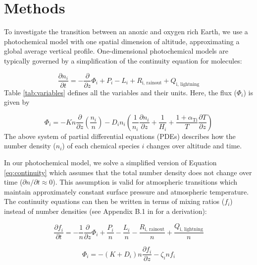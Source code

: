 \section{Methods} \label{sec:goe_methods}

To investigate the transition between an anoxic and oxygen rich Earth, we use a photochemical model with one spatial dimension of altitude, approximating a global average vertical profile. One-dimensional photochemical models are typically governed by a simplification of the continuity equation for molecules:

\begin{equation} \label{eq:continuity}
  \frac{\partial n_{i}}{\partial t} = - \frac{\partial}{\partial z}\Phi_{i} + P_{i} - L_{i} + R_{\text{i,\ rainout}} + Q_{\text{i,\ lightning}}
\end{equation}
Table \ref{tab:variables} defines all the variables and their units. Here, the flux ($\Phi_{i}$) is given by

\begin{equation} 
  \Phi_{i} = - Kn\frac{\partial}{\partial z}\left( \frac{n_{i}}{n} \right) - D_{i}n_{i}\left( \frac{1}{n_{i}}\frac{\partial n_{i}}{\partial z} + \frac{1}{H_{i}} + \frac{1 + \alpha_{\text{Ti}}}{T}\frac{\partial T}{\partial z} \right)
\end{equation}
The above system of partial differential equations (PDEs) describes how the number density ($n_{i}$) of each chemical species $i$ changes over altitude and time.

In our photochemical model, we solve a simplified version of Equation \eqref{eq:continuity} which assumes that the total number density does not change over time ($\partial n / \partial t \approx 0$). This assumption is valid for atmospheric transitions which maintain approximately constant surface pressure and atmospheric temperature. The continuity equations can then be written in terms of mixing ratios ($f_{i}$) instead of number densities (see Appendix B.1 in \citet{Catling_2017} for a derivation):

\begin{equation} \label{eq:continuity_simple}
  \frac{\partial f_{i}}{\partial t} = - \frac{1}{n}\frac{\partial}{\partial z}\Phi_{i} + \frac{P_{i}}{n} - \frac{L_{i}}{n} - \frac{R_{\text{i,\ rainout}}}{n} + \frac{Q_{\text{i,\ lightning}}}{n}
\end{equation}

\begin{equation}
  \Phi_{i} = - \left( K + D_{i} \right)n\frac{\partial f_{i}}{\partial z} - \zeta_{i}nf_{i}
\end{equation}

